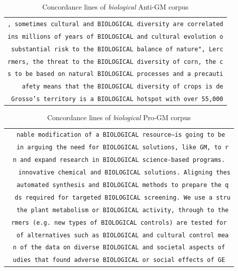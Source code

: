 \begin{table}[h]
\begin{footnotesize}
\centering
\def\arraystretch{1.1}%
 \begin{tabular}{c} 

\texttt{, sometimes cultural and BIOLOGICAL diversity are correlated} \\ 
\texttt{ins millions of years of BIOLOGICAL and cultural evolution o} \\ 
\texttt{ substantial risk to the BIOLOGICAL balance of nature", Lerc} \\ 
\texttt{rmers, the threat to the BIOLOGICAL diversity of corn, the c} \\ 
\texttt{s to be based on natural BIOLOGICAL processes and a precauti} \\ 
\texttt{\ \ \ \ afety means that the BIOLOGICAL diversity of crops is de} \\ 
\texttt{\ Grosso's territory is a BIOLOGICAL hotspot with over 55,000} \\ 
 \end{tabular}
\caption{Concordance lines of \textit{biological} Anti-GM corpus}
\label{tab:table1}
\end{footnotesize}
\end{table}

\begin{table}[h]
\begin{footnotesize}
\centering
\def\arraystretch{1.1}%
 \begin{tabular}{c} 
\texttt{\ nable modification of a BIOLOGICAL resource--is going to be} \\ 
\texttt{\ \ in arguing the need for BIOLOGICAL solutions, like GM, to r} \\ 
\texttt{n and expand research in BIOLOGICAL science-based programs.} \\ 
\texttt{\ \ \ innovative chemical and BIOLOGICAL solutions. Aligning thes} \\ 
\texttt{\ \ automated synthesis and BIOLOGICAL methods to prepare the q} \\ 
\texttt{\ \ ds required for targeted BIOLOGICAL screening. We use a stru} \\ 
\texttt{\ \ the plant metabolism or BIOLOGICAL activity, through to the} \\ 
\texttt{rmers (e.g. new types of BIOLOGICAL controls) are tested for} \\ 
\texttt{\ \ of alternatives such as BIOLOGICAL and cultural control mea} \\ 
\texttt{\ n of the data on diverse BIOLOGICAL and societal aspects of } \\ 
\texttt{\ udies that found adverse BIOLOGICAL or social effects of GE } \\ 
 \end{tabular}
\caption{Concordance lines of \textit{biological} Pro-GM corpus}
\label{tab:table1}
\end{footnotesize}
\end{table}

